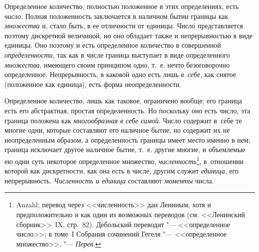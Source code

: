 Определенное количество, полностью положенное в этих определениях, есть
{\em число}. Полная положенность заключается в наличном бытии границы как
{\em множества} и, стало быть, в ее отличности от единицы. Число представляется
поэтому дискретной величиной, но оно обладает также и непрерывностью в виде
единицы. Оно поэтому и есть определенное количество в совершенной
{\em определенности}, так как в числе граница выступает в виде определенного
{\em множества}, имеющего своим принципом одно, т.~е. нечто безоговорочно
определенное. Непрерывность, в каковой одно есть лишь {\em в~себе}, как снятое
(положенное как единица), есть форма неопределенности.

Определенное количество, лишь как таковое, ограничено вообще; его граница есть
его абстрактная, простая определенность. Но поскольку оно есть число, эта
граница положена как {\em многообразная в себе самой}. Число содержит в~себе те
многие одни, которые составляют его наличное бытие, но содержит их не
неопределенным образом, а определенность границы имеет место именно в нем;
граница исключает другое наличное бытие, т.~е. другие многие, и объемлемые ею
одни суть некоторое определенное множество, {\em численность}\footnote{Anzahl;
перевод через <<численность>> дан Лениным, хотя и предположительно и как один
из возможных переводов (см. <<Ленинский сборник>>~IX, стр.~82). Дебольский
переводит "--- <<определенное число>>; в томе~I Собрания сочинений Гегеля "---
<<определенное множество>>. "--- {\em Перев}.}, в~отношении которой как
дискретности, как она есть в числе, другим служит {\em единица}, его
непрерывность. {\em Численность и единица} составляют {\em моменты} числа.

